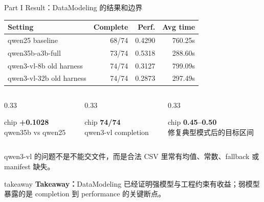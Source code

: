 \documentclass[aspectratio=169,UTF8]{ctexbeamer}
\newcommand{\smallnote}[1]{{\scriptsize\textcolor{DWGray}{#1}}}
\newcommand{\takeaway}[1]{%
  \vspace{0.35em}
  \begin{beamercolorbox}[wd=\textwidth,sep=0.75ex,rounded=true]{takeaway}
    \textbf{Takeaway：}#1
  \end{beamercolorbox}
}
\newcommand{\metric}[2]{%
  \begin{beamercolorbox}[wd=.92\linewidth,sep=0.8ex,rounded=true,center]{chip}
    {\Large\textbf{#1}}\\[-0.2em]{\scriptsize #2}
  \end{beamercolorbox}
}
\begin{document}
\begin{frame}{Part I Result：DataModeling 的结果和边界}
\footnotesize
\begin{tabularx}{\textwidth}{p{} r r r}
\toprule
Setting & Complete & Perf. & Avg time \\
\midrule
qwen25 baseline & 68/74 & 0.4290 & 760.25s \\
qwen35b-a3b-full & 73/74 & 0.5318 & 288.60s \\
qwen3-vl-8b old harness & 74/74 & 0.3127 & 799.09s \\
qwen3-vl-32b old harness & 74/74 & 0.2873 & 297.49s \\
\bottomrule
\end{tabularx}
\vspace{0.65em}
\begin{columns}[T]
\begin{column}{0.33\textwidth}\metric{+0.1028}{qwen35b vs qwen25}\end{column}
\begin{column}{0.33\textwidth}\metric{74/74}{qwen3-vl completion}\end{column}
\begin{column}{0.33\textwidth}\metric{0.45--0.50}{修复典型模式后的目标区间}\end{column}
\end{columns}
\vspace{0.45em}
\smallnote{qwen3-vl 的问题不是不能交文件，而是合法 CSV 里常有均值、常数、fallback 或 manifest 缺失。}
\takeaway{DataModeling 已经证明强模型与工程约束有收益；弱模型暴露的是 completion 到 performance 的关键断点。}
\end{frame}
\end{document}

